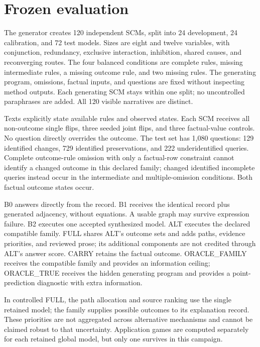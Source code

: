 \documentclass{svproc}
\begin{document}
\section{Frozen evaluation}
The generator creates 120 independent SCMs, split into 24 development, 24 calibration, and 72 test models. Sizes are eight and twelve variables, with conjunction, redundancy, exclusive interaction, inhibition, shared causes, and reconverging routes. The four balanced conditions are complete rules, missing intermediate rules, a missing outcome rule, and two missing rules. The generating program, omissions, factual inputs, and questions are fixed without inspecting method outputs. Each generating SCM stays within one split; no uncontrolled paraphrases are added. All 120 visible narratives are distinct.

Texts explicitly state available rules and observed states. Each SCM receives all non-outcome single flips, three seeded joint flips, and three factual-value controls. No question directly overrides the outcome. The test set has 1,080 questions: 129 identified changes, 729 identified preservations, and 222 underidentified queries. Complete outcome-rule omission with only a factual-row constraint cannot identify a changed outcome in this declared family; changed identified incomplete queries instead occur in the intermediate and multiple-omission conditions. Both factual outcome states occur.

B0 answers directly from the record. B1 receives the identical record plus generated adjacency, without equations. A usable graph may survive expression failure. B2 executes one accepted synthesized model. ALT executes the declared compatible family. FULL shares ALT's outcome sets and adds paths, evidence priorities, and reviewed prose; its additional components are not credited through ALT's answer score. CARRY retains the factual outcome. ORACLE\_FAMILY receives the compatible family and provides an information ceiling; ORACLE\_TRUE receives the hidden generating program and provides a point-prediction diagnostic with extra information.

In controlled FULL, the path allocation and source ranking use the single retained model; the family supplies possible outcomes to its explanation record. These priorities are not aggregated across alternative mechanisms and cannot be claimed robust to that uncertainty. Application games are computed separately for each retained global model, but only one survives in this campaign.
\end{document}
